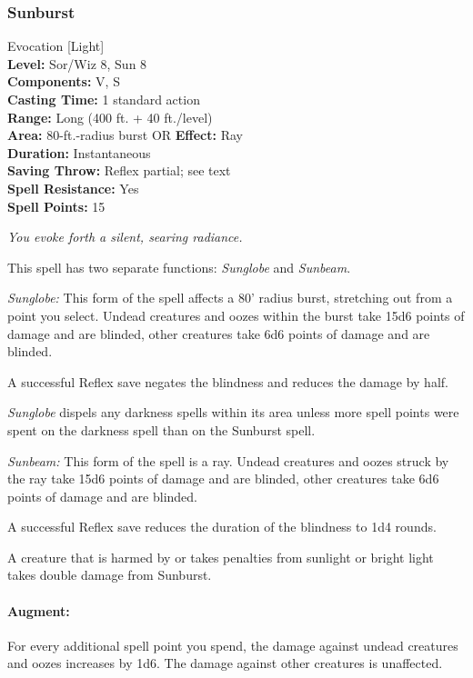 \subsubsection{Sunburst}
\label{Spell:Sunburst}
Evocation [Light]
\\ \textbf{Level:} Sor/Wiz 8, Sun 8
\\ \textbf{Components:} V, S
\\ \textbf{Casting Time:} 1 standard action
\\ \textbf{Range:} Long (400 ft. + 40 ft./level)
\\ \textbf{Area:} 80-ft.-radius burst OR \textbf{Effect:} Ray
\\ \textbf{Duration:} Instantaneous
\\ \textbf{Saving Throw:} Reflex partial; see text
\\ \textbf{Spell Resistance:} Yes
\\ \textbf{Spell Points:} 15

\emph{You evoke forth a silent, searing radiance.} 

This spell has two separate functions: \emph{Sunglobe} and \emph{Sunbeam}.

\begin{list}{}{\leftmargin=1em}
 \item \emph{Sunglobe:} This form of the spell affects a 80' radius burst, stretching out from a point you select. Undead creatures and oozes within the burst take 15d6 points of damage and are blinded, other creatures take 6d6 points of damage and are blinded.

A successful Reflex save negates the blindness and reduces the damage by half.

\emph{Sunglobe} dispels any darkness spells within its area unless more spell points were spent on the darkness spell than on the Sunburst spell.
 \item \emph{Sunbeam:} This form of the spell is a ray. Undead creatures and oozes struck by the ray take 15d6 points of damage and are blinded, other creatures take 6d6 points of damage and are blinded.

A successful Reflex save reduces the duration of the blindness to 1d4 rounds.
\end{list} 
A creature that is harmed by or takes penalties from sunlight or bright light takes double damage from Sunburst.

\paragraph{Augment:} For every additional spell point you spend, the damage against undead creatures and oozes increases by 1d6.
The damage against other creatures is unaffected.

